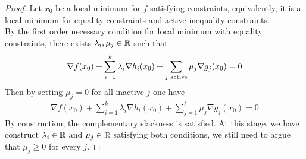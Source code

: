 \documentclass{article}
\begin{document}
   	\begin{proof}
   		Let $x_0$ be a local minimum for $f$ satisfying constraints, equivalently, it is a local minimum for equality constraints and active inequality constraints. \\
   		By the first order necessary condition for local minimum with equality constraints, there exists $\lambda_i, \mu_j \in \mathbb{R}$ such that
   		\begin{align}
   			\nabla f(x_0) + \sum_{i=1}^k \lambda_i \nabla h_i(x_0) + \sum_{j \text{{ active}}} \mu_j \nabla g_j(x_0) = 0
   		\end{align}
   		Then by setting $\mu_j = 0$ for all inactive $j$ one have
   		\begin{align}
   			\nabla f(x_0) + \sum_{i=1}^k \lambda_i \nabla h_i(x_0) + \sum_{j=1}^\ell \mu_j \nabla g_j(x_0) = 0
   		\end{align}
   		By construction, the complementary slackness is satisfied. At this stage, we have construct $\lambda_i \in \mathbb{R}$ and $\mu_j \in \mathbb{R}$ satisfying both conditions, we still need to argue that $\mu_j \geq 0$ for every $j$.
   	\end{proof}
   	
\end{document}
